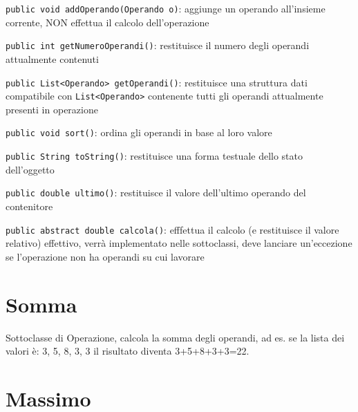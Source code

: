 \documentclass[12pt]{article}
\begin{document}
\begin{compactitem}
 \item \texttt{public void addOperando(Operando o)}: aggiunge un operando all'insieme corrente, NON effettua il calcolo dell'operazione

 \item \texttt{public int getNumeroOperandi()}: restituisce il numero degli operandi attualmente contenuti
 
 \item \texttt{public List<Operando> getOperandi()}: restituisce una struttura dati compatibile con 
\texttt{List<Operando>} contenente tutti gli operandi attualmente presenti in operazione



\item \texttt{public void sort()}: ordina gli operandi in base al loro valore

\item \texttt{public String toString()}: restituisce una forma testuale dello stato dell'oggetto

\item \texttt{public double ultimo()}: restituisce il valore dell'ultimo operando del contenitore

\item \texttt{public abstract double calcola()}: efffettua il calcolo (e restituisce il valore relativo) effettivo, verrà implementato nelle sottoclassi, deve lanciare un'eccezione se l'operazione non ha operandi su cui lavorare
\end{compactitem}

\section{Somma}

Sottoclasse di Operazione, calcola la somma degli operandi, ad es. se la lista dei valori è: 3, 5, 8, 3, 3 il risultato diventa 3+5+8+3+3=22.


\section{Massimo}
\end{document}
